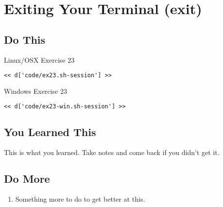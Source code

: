 \chapter{Exiting Your Terminal (exit)}

\section{Do This}

\begin{code}{Linux/OSX Exercise 23}
\begin{Verbatim}
<< d['code/ex23.sh-session'] >>
\end{Verbatim}
\end{code}

\begin{code}{Windows Exercise 23}
\begin{Verbatim}
<< d['code/ex23-win.sh-session'] >>
\end{Verbatim}
\end{code}

\section{You Learned This}

This is what you learned.  Take notes and come back if you didn't get it.

\section{Do More}

\begin{enumerate}
\item Something more to do to get better at this.
\end{enumerate}

